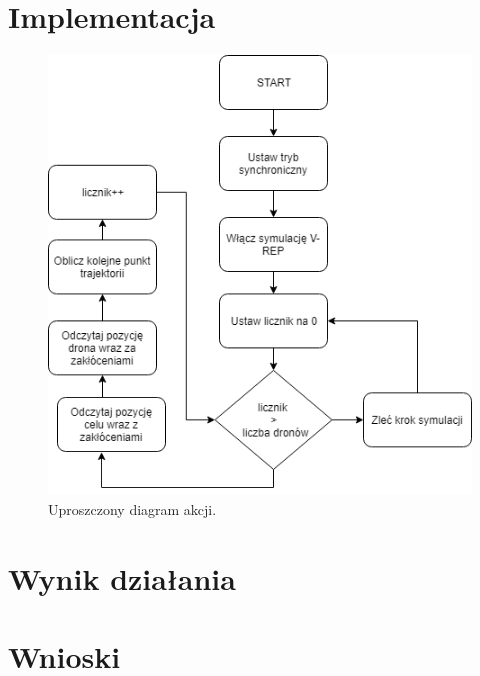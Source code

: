 \documentclass[a4paper, 11pt, oneside]{article}
\begin{document}
\section{Implementacja}
\begin{figure}[H]
\centering
\includegraphics[scale=0.5]{uproszczony_digram_akcji.png}
\caption{Uproszczony diagram akcji.}

\end{figure}
\section{Wynik działania}
\section{Wnioski}
\end{document}
